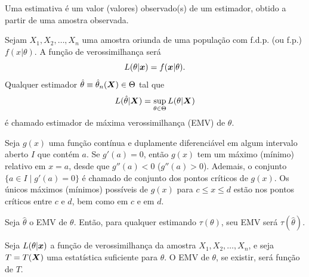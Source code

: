 \begin{definition}[Estimativa]
	Uma estimativa é um valor (valores) observado(s) de um estimador, obtido a partir de uma amostra observada.
\end{definition}

\begin{definition}
	Sejam $X_1, X_2, \ldots, X_n$ uma amostra oriunda de uma população com f.d.p. (ou f.p.) $f(x | \theta)$. A função de verossimilhança será
	\[
	L(\theta | \bm{x}) = f(\bm{x} | \theta).
	\]
	Qualquer estimador $\hat{\theta} \equiv \hat{\theta}_n(\bm{X}) \in \Theta$ tal que
	\[
	L(\hat{\theta} | \bm{X}) = \sup_{\theta \in \Theta} L(\theta | \bm{X})
	\]
	é chamado estimador de máxima verossimilhança (EMV) de $\theta$.
\end{definition}

\begin{theorem}
	Seja $g(x)$ uma função contínua e duplamente diferenciável em algum intervalo aberto $I$ que contém $a$. Se $g'(a) = 0$, então $g(x)$ tem um máximo (mínimo) relativo em $x = a$, desde que $g''(a) < 0$ ($g''(a) > 0$). Ademais, o conjunto $\{a \in I \mid g'(a) = 0\}$ é chamado de conjunto dos pontos críticos de $g(x)$. Os únicos máximos (mínimos) possíveis de $g(x)$ para $c \leq x \leq d$ estão nos pontos críticos entre $c$ e $d$, bem como em $c$ e em $d$.
\end{theorem}

\begin{theorem}
	Seja $\hat{\theta}$ o EMV de $\theta$. Então, para qualquer estimando $\tau(\theta)$, seu EMV será $\tau(\hat{\theta})$.
\end{theorem}

\begin{theorem}
	Seja $L(\theta | \bm{x})$ a função de verossimilhança da amostra $X_1, X_2, \ldots, X_n$, e seja $T = T(\bm{X})$ uma estatística suficiente para $\theta$. O EMV de $\theta$, se existir, será função de $T$.
\end{theorem}

